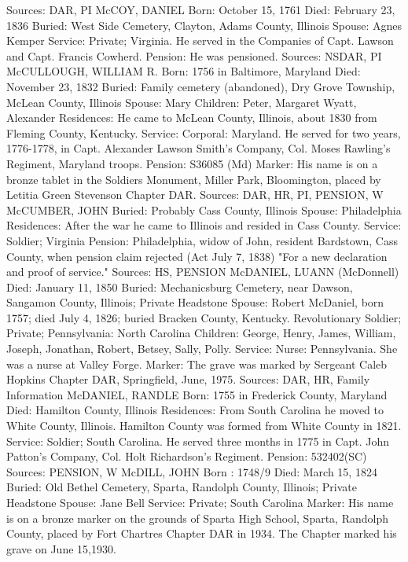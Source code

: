 Sources: DAR, PI 
McCOY, DANIEL
Born: October 15, 1761
Died: February 23, 1836
Buried: West Side Cemetery, Clayton, Adams County, Illinois
Spouse: Agnes Kemper 
Service: Private; Virginia. He served in the Companies of Capt. Lawson and Capt. Francis Cowherd. 
Pension: He was pensioned.
Sources: NSDAR, PI 
McCULLOUGH, WILLIAM R. 
Born: 1756 in Baltimore, Maryland
Died: November 23, 1832 
Buried: Family cemetery (abandoned), Dry Grove Township, McLean County, Illinois
Spouse: Mary 
Children: Peter, Margaret Wyatt, Alexander 
Residences: He came to McLean County, Illinois, about 1830 from Fleming County, Kentucky. 
Service: Corporal: Maryland. He served for two years, 1776-1778, in Capt. Alex­ander Lawson Smith's Company, Col. Moses Rawling's Regiment, Maryland troops. 
Pension: S36085 (Md)
Marker: His name is on a bronze tablet in the Soldiers Monument, Miller Park, Bloomington, placed by Letitia Green Stevenson Chapter DAR.
Sources: DAR, HR, PI, PENSION, W 
McCUMBER, JOHN
Buried: Probably Cass County, Illinois
Spouse: Philadelphia
Residences: After the war he came to Illinois and resided in Cass County.
Service: Soldier; Virginia
Pension: Philadelphia, widow of John, resident Bardstown, Cass County, when pension claim rejected (Act July 7, 1838) "For a new declaration and proof of service."
Sources: HS, PENSION 
McDANIEL, LUANN (McDonnell)
Died: January 11, 1850 
Buried: Mechanicsburg Cemetery, near Dawson, Sangamon County, Illinois; 
Private Headstone
Spouse: Robert McDaniel, born 1757; died July 4, 1826; buried Bracken County, Kentucky. Revolutionary Soldier; Private; Pennsylvania: North Carolina
Children: George, Henry, James, William, Joseph, Jonathan, Robert, Betsey, Sally, Polly.
Service: Nurse: Pennsylvania. She was a nurse at Valley Forge.
Marker: The grave was marked by Sergeant Caleb Hopkins Chapter DAR, Spring­field, June, 1975.
Sources: DAR, HR, Family Information 
McDANIEL, RANDLE
Born: 1755 in Frederick County, Maryland
Died: Hamilton County, Illinois
Residences: From South Carolina he moved to White County, Illinois. Hamilton County was formed from White County in 1821. 
Service: Soldier; South Carolina. He served three months in 1775 in Capt. John Patton's Company, Col. Holt Richardson's Regiment. 
Pension: 532402(SC)
Sources: PENSION, W 
McDILL, JOHN 
Born : 1748/9 
Died: March 15, 1824 
Buried: Old Bethel Cemetery, Sparta, Randolph County, Illinois; Private Headstone
Spouse: Jane Bell Service: Private; South Carolina
Marker: His name is on a bronze marker on the grounds of Sparta High School, Sparta, Randolph County, placed by Fort Chartres Chapter DAR in 1934. The Chapter marked his grave on June 15,1930.
